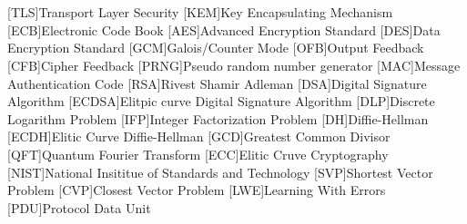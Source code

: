 \cleardoublepage
\chapter*{\listofabbrevname}
{}

\begin{acronym}[mmmmmmm]
	[TLS]{Transport Layer Security}
	[KEM]{Key Encapsulating Mechanism}
	[ECB]{Electronic Code Book}
	[AES]{Advanced Encryption Standard}
	[DES]{Data Encryption Standard}
	[GCM]{Galois/Counter Mode}
	[OFB]{Output Feedback}
	[CFB]{Cipher Feedback}
	[PRNG]{Pseudo random number generator}
	[MAC]{Message Authentication Code}
	[RSA]{Rivest Shamir Adleman}
	[DSA]{Digital Signature Algorithm}
	[ECDSA]{Elitpic curve Digital Signature Algorithm}
	[DLP]{Discrete Logarithm Problem}
	[IFP]{Integer Factorization Problem}
	[DH]{Diffie-Hellman}
	[ECDH]{Elitic Curve Diffie-Hellman}
	[GCD]{Greatest Common Divisor}
	[QFT]{Quantum Fourier Transform}
	[ECC]{Elitic Cruve Cryptography}
	[NIST]{National Insititue of Standards and Technology}
	[SVP]{Shortest Vector Problem}
	[CVP]{Closest Vector Problem}
	[LWE]{Learning With Errors}
  [PDU]{Protocol Data Unit}
\end{acronym}
